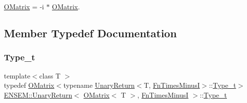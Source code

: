 \mbox{\hyperlink{classENSEM_1_1OMatrix}{O\+Matrix}} = -\/i $\ast$ \mbox{\hyperlink{classENSEM_1_1OMatrix}{O\+Matrix}}. 

\subsection{Member Typedef Documentation}
\mbox{\label{structENSEM_1_1UnaryReturn_3_01OMatrix_3_01T_01_4_00_01FnTimesMinusI_01_4_a61e8ab0fd80b071e9277449e6f8bd901}} 
\subsubsection{\texorpdfstring{Type\_t}{Type\_t}\hspace{0.1cm}{\footnotesize\ttfamily [1/2]}}
{\footnotesize\ttfamily template$<$class T $>$ \\
typedef \mbox{\hyperlink{classENSEM_1_1OMatrix}{O\+Matrix}}$<$typename \mbox{\hyperlink{structENSEM_1_1UnaryReturn}{Unary\+Return}}$<$T, \mbox{\hyperlink{structENSEM_1_1FnTimesMinusI}{Fn\+Times\+MinusI}}$>$\+::\mbox{\hyperlink{structENSEM_1_1UnaryReturn_3_01OMatrix_3_01T_01_4_00_01FnTimesMinusI_01_4_a61e8ab0fd80b071e9277449e6f8bd901}{Type\+\_\+t}}$>$ \mbox{\hyperlink{structENSEM_1_1UnaryReturn}{E\+N\+S\+E\+M\+::\+Unary\+Return}}$<$ \mbox{\hyperlink{classENSEM_1_1OMatrix}{O\+Matrix}}$<$ T $>$, \mbox{\hyperlink{structENSEM_1_1FnTimesMinusI}{Fn\+Times\+MinusI}} $>$\+::\mbox{\hyperlink{structENSEM_1_1UnaryReturn_3_01OMatrix_3_01T_01_4_00_01FnTimesMinusI_01_4_a61e8ab0fd80b071e9277449e6f8bd901}{Type\+\_\+t}}}

\mbox{\label{structENSEM_1_1UnaryReturn_3_01OMatrix_3_01T_01_4_00_01FnTimesMinusI_01_4_a61e8ab0fd80b071e9277449e6f8bd901}} 

